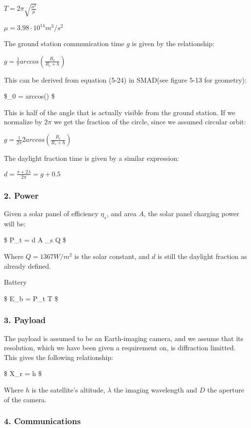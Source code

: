 \documentclass[11pt]{article}
\begin{document}
\(T = 2\pi\sqrt{\frac{a^3}{\mu}}\)

\(\mu = 3.98\cdot10^{14}m^3/s^2\)

The ground station communication time \(g\) is given by the
relationship:

\(g = \frac{1}{\pi}arccos\left(\frac{R_e}{R_e+h}\right)\)

This can be derived from equation (5-24) in SMAD(see figure 5-13 for
geometry):

\$\lambda\_0 = arccos\left(\right) \$

This is half of the angle that is actually visible from the ground
station. If we normalize by \(2\pi\) we get the fraction of the circle,
since we assumed circular orbit:

\(g = \frac{1}{2\pi}2 arccos\left(\frac{R_e}{R_e+h}\right)\)

The daylight fraction time is given by a similar expression:

\(d = \frac{\pi+2\lambda}{2\pi} = g + 0.5\)

    \hypertarget{power}{%
\subsubsection{2. Power}\label{power}}

    Given a solar panel of efficiency \(\eta_s\), and area \(A\), the solar
panel charging power will be:

\$ P\_t = d A \eta\_s Q \$

Where \(Q=1367W/m^2\) is the solar constant, and \(d\) is still the
daylight fraction as already defined.

Battery

\$ E\_b =  P\_t \cdot T \$

    \hypertarget{payload}{%
\subsubsection{3. Payload}\label{payload}}

The payload is assumed to be an Earth-imaging camera, and we assume that
its resolution, which we have been given a requirement on, is
diffraction limitted. This gives the following relationship:

\$ X\_r = h  \$

Where \(h\) is the satellite's altitude, \(\lambda\) the imaging
wavelength and \(D\) the aperture of the camera.

    \hypertarget{communications}{%
\subsubsection{4. Communications}\label{communications}}
\end{document}
